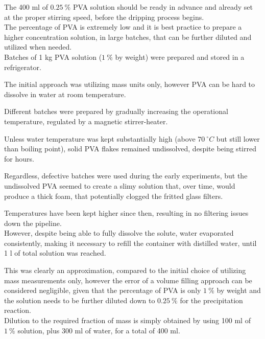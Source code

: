 \documentclass{article}
\begin{document}
        The 400 ml of $0.25 \ \%$ PVA solution should be ready in advance and already set at the proper stirring speed, before 
        the dripping process begins. \\ 

        The percentage of PVA is extremely low and it is best practice to prepare a higher concentration solution, in large batches,  
        that can be further diluted and utilized when needed. \\

        Batches of 1 kg PVA solution ($1 \ \%$ by weight) were prepared and stored in a refrigerator. 

        The initial approach was utilizing mass units only, however PVA can be hard to dissolve in water at room temperature. 
        
        Different batches were prepared by gradually increasing the operational temperature, regulated by a magnetic stirrer-heater. 

        Unless water temperature was kept substantially high (above $70 \ ^{\circ}C $ but still lower than boiling point), 
        solid PVA flakes remained undissolved, despite being stirred for hours. 

        Regardless, defective batches were used during the early experiments, but the undissolved PVA 
        seemed to create a slimy solution that, over time, would produce a thick foam, that potentially clogged 
        the fritted glass filters. 

        Temperatures have been kept higher since then, resulting in no filtering issues down the pipeline. \\ 

        However, despite being able to fully dissolve the solute, water evaporated consistently, making it necessary to refill the 
        container with distilled water, until 1 l of total solution was reached. 

        This was clearly an approximation, compared to the initial choice of utilizing mass measurements only, however 
        the error of a volume filling approach can be considered negligible, given that the 
        percentage of PVA is only $1 \ \%$ by weight and the solution needs to be further diluted down to $0.25 \ \%$ for 
        the precipitation reaction. \\ 

        Dilution to the required fraction of mass is simply obtained by using 100 ml of $1 \ \%$ solution, 
        plus 300 ml of water, for a total of 400 ml. \\ 
\end{document}
